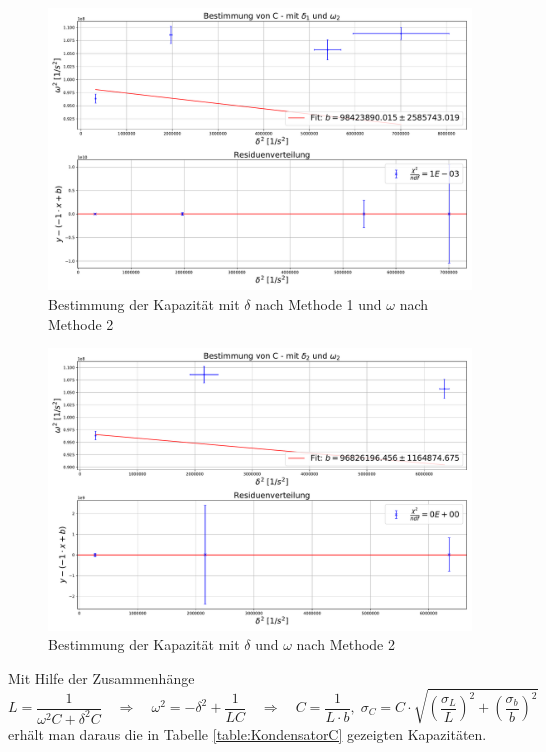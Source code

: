\documentclass[a4paper, 11pt]{article}
\begin{document}
\begin{figure}[H]
	\centering
	\includegraphics[scale=0.4]{../Plots/BestimmungCdelta_1omega_2.pdf}
	\caption{Bestimmung der Kapazität mit $\delta$ nach Methode 1 und $\omega$ nach Methode 2}
	\label{fig:C12}
\end{figure}

\begin{figure}[H]
	\centering
	\includegraphics[scale=0.4]{../Plots/BestimmungCdelta_2omega_2.pdf}
	\caption{Bestimmung der Kapazität mit $\delta$ und $\omega$ nach Methode 2}
	\label{fig:C22}
\end{figure}

Mit Hilfe der Zusammenhänge
\begin{equation}
L = \frac{1}{\omega^2C + \delta^2C} \quad \Rightarrow \quad \omega^2 = -\delta^2 + \frac{1}{LC} \quad \Rightarrow \quad C = \frac{1}{L \cdot b},\; \sigma_C = C \cdot \sqrt{\left(\frac{\sigma_L}{L}\right)^2 + \left(\frac{\sigma_b}{b}\right)^2} 
\end{equation}
erhält man daraus die in Tabelle \ref{table:KondensatorC} gezeigten Kapazitäten.
\end{document}
